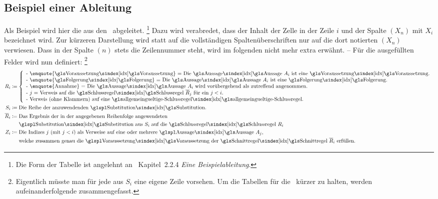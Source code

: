 {\subsection{Beispiel einer Ableitung}%
\label{sub:BeispielAbleitung}

Als Beispiel wird hier die  aus den \Basisregeln\ abgeleitet.%
\footnote{%
	Die Form der Tabelle ist angelehnt an~\cite{bib:NatuerlichesSchliessen} Kapitel~2.2.4 \emph{Eine Beispielableitung}.
}
Dazu wird verabredet, dass  der Inhalt der Zelle in der Zeile $i$ und der Spalte $(X_n)$ mit $X_i$ bezeichnet wird.
Zur kürzeren Darstellung wird statt auf die vollständigen Spaltenüberschriften nur auf die dort notierten $(X_n)$ verwiesen. Dass in der Spalte $(n)$ stets die Zeilennummer steht, wird im folgenden nicht mehr extra erwähnt.
-- Für die ausgefüllten Felder wird nun definiert:%
\footnote{%
	Eigentlich müsste man für jede  aus $S_i$ eine eigene Zeile vorsehen.
	Um die Tabellen für die \Beweise\ kürzer zu halten, werden aufeinanderfolgende  zusammengefasst.
}
\begin{align}
	R_i & \defeq
	\left\{
		\begin{array}{l}
			\text{- \enquote{\glsIdx{Voraussetzung}} = Die \Aussage\ $A_i$ ist eine \glsIdx{Voraussetzung}.}\\
			\text{- \enquote{\glsIdx{Folgerung}} = Die \Aussage\ $A_i$ ist eine \glsIdx{Folgerung}.}\\
			\text{- \enquote{Annahme} = Die \Aussage\ $A_i$ wird vorübergehend als zutreffend angenommen.}\\
			\text{- $j$ = Verweis auf die \glsIdx{Schlussregel} $\overline{R}_j$ für ein $j < i$.}\\
			\text{- Verweis (ohne Klammern) auf eine \glsIdx{allgemeingueltige-Schlussregel}.}
		\end{array}
	\right.
	\\
	S_i & \defeq \text{Die Reihe der anzuwendenden \glsIdxPl{Substitution}.}
	\\
	\overline{R}_i & \defeq \text{Das Ergebnis der in der angegebenen Reihenfolge angewendeten}\\
	& \quad\;\; \text{\glsIdxPl{Substitution} aus $S_i$ auf die \glsIdx{Schlussregel} $R_i$}
	\\
	Z_i & \defeq \text{Die Indizes $j$ (mit $j < i$) als Verweise auf eine oder mehrere \Aussagen\ $A_j$,}\\
	& \quad\;\; \text{welche zusammen genau die \glsIdxPl{Voraussetzung} der \glsIdx{Schnittregel} } \overline{R}_i \text{ erfüllen.}

\end{align}}
